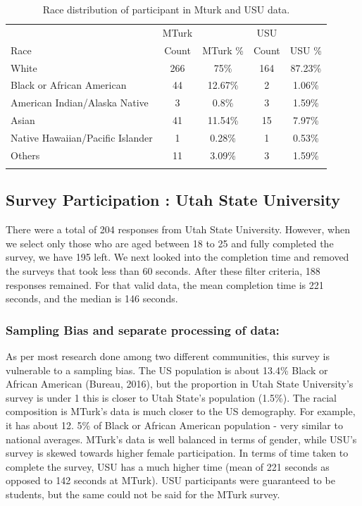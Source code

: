 \documentclass[conference]{IEEEtran}
\begin{document}
\begin{table}
\centering
\begin{tabular}{|l|c|c|c|c|}
\hline
                                          & MTurk && USU &\\
Race                                      & Count & MTurk \% & Count & USU \% \\
\hline
White                                     & 266 & 75\% & 164 & 87.23\% \\
Black or African American                 & 44 & 12.67\%  & 2 & 1.06\% \\
American Indian/Alaska Native          & 3  & 0.8\% & 3 & 1.59\%  \\
Asian                                     & 41  & 11.54\% & 15 & 7.97\%  \\
Native Hawaiian/Pacific Islander & 1 & 0.28\% &  1 &  0.53\%  \\
Others                                    & 11  & 3.09\% & 3 & 1.59\%  \\
\hline
\vspace{4pt}
\end{tabular}
\caption{Race distribution of  participant in Mturk and USU data.}
\label{table:mtrace}
\end{table}


\subsection{Survey Participation : Utah State University}\label{subsec3}
There were a total of 204 responses from Utah State University. However, when we select only those who are aged between 18 to 25 and fully completed the survey, we have 195 left. We next looked into the completion time and removed the surveys that took less than 60 seconds. After these filter criteria, 188 responses remained. For that valid data, the mean completion time is 221 seconds, and the median is 146 seconds. 

\subsubsection{Sampling Bias and separate processing of data:}\label{subsubsec3}
As per most research done among two different communities, this survey is vulnerable
to a sampling bias. The US population is about 13.4\% Black or African American
(Bureau, 2016), but the proportion in Utah State University’s survey is under 1%
this is closer to Utah State’s population (1.5\%). The racial composition is MTurk’s data is much closer to the US
demography. For example, it has about 12.
5\% of Black or African American population
- very similar to national averages.
MTurk’s data is well balanced in terms of gender, while USU’s survey is skewed
towards higher female participation. In terms of time taken to complete the survey, USU
has a much higher time (mean of 221 seconds as opposed to 142 seconds at MTurk).
USU participants were guaranteed to be students, but the same could not be said for the
MTurk survey.
\end{document}
